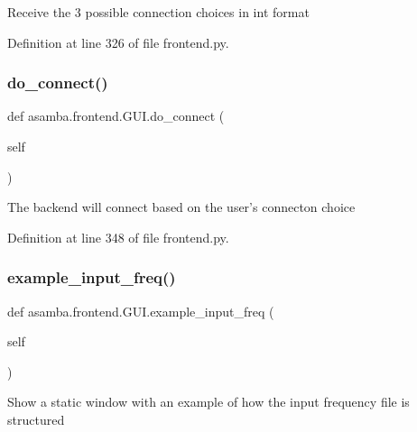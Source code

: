 \begin{DoxyVerb}Receive the 3 possible connection choices in int format \end{DoxyVerb}
 

Definition at line 326 of file frontend.\+py.

\mbox{\label{classasamba_1_1frontend_1_1_g_u_i_afb43aa6632c5aa17f9cf4a0270659a7f}} 
\subsubsection{\texorpdfstring{do\+\_\+connect()}{do\_connect()}}
{\footnotesize\ttfamily def asamba.\+frontend.\+G\+U\+I.\+do\+\_\+connect (\begin{DoxyParamCaption}\item[{}]{self }\end{DoxyParamCaption})}

\begin{DoxyVerb}The backend will connect based on the user's connecton choice \end{DoxyVerb}
 

Definition at line 348 of file frontend.\+py.

\mbox{\label{classasamba_1_1frontend_1_1_g_u_i_a515d6655fbf006441ec5ac9b96e5bd7c}} 
\subsubsection{\texorpdfstring{example\+\_\+input\+\_\+freq()}{example\_input\_freq()}}
{\footnotesize\ttfamily def asamba.\+frontend.\+G\+U\+I.\+example\+\_\+input\+\_\+freq (\begin{DoxyParamCaption}\item[{}]{self }\end{DoxyParamCaption})}

\begin{DoxyVerb}Show a static window with an example of how the input frequency file is structured \end{DoxyVerb}
 


